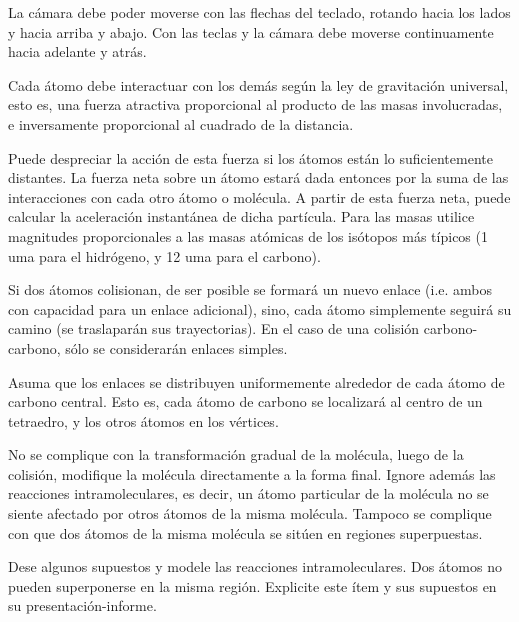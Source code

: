 \documentclass[letterpaper,11pt]{article} %
\begin{document}

La cámara debe poder moverse con las flechas del teclado, rotando hacia los lados y hacia arriba y abajo. Con las teclas  y  la cámara debe moverse continuamente hacia adelante y atrás.


Cada átomo debe interactuar con los demás según la ley de gravitación universal, esto es, una fuerza atractiva proporcional al producto de las masas involucradas, e inversamente proporcional al cuadrado de la distancia.


\newp Puede despreciar la acción de esta fuerza si los átomos están lo suficientemente distantes. La fuerza neta sobre un átomo estará dada entonces por la suma de las interacciones con cada otro átomo o molécula. A partir de esta fuerza neta, puede calcular la aceleración instantánea de dicha partícula. Para las masas utilice magnitudes proporcionales a las masas atómicas de los isótopos más típicos (1 uma para el hidrógeno, y 12 uma para el carbono).

\newp Si dos átomos colisionan, de ser posible se formará un nuevo enlace (i.e. ambos con capacidad para un enlace adicional), sino, cada átomo simplemente seguirá su camino (se traslaparán sus trayectorias). En el caso de una colisión carbono-carbono, sólo se considerarán enlaces simples.

\newp Asuma que los enlaces se distribuyen uniformemente alrededor de cada átomo de carbono central. Esto es, cada átomo de carbono se localizará al centro de un tetraedro, y los otros átomos en los vértices.

\newp No se complique con la transformación gradual de la molécula, luego de la colisión, modifique la molécula directamente a la forma final. Ignore además las reacciones intramoleculares, es decir, un átomo particular de la molécula no se siente afectado por otros átomos de la misma molécula. Tampoco se complique con que dos átomos de la misma molécula se sitúen en regiones superpuestas.


Dese algunos supuestos y modele las reacciones intramoleculares. Dos átomos no pueden superponerse en la misma región. Explicite este ítem y sus supuestos en su presentación-informe.
\end{document}

